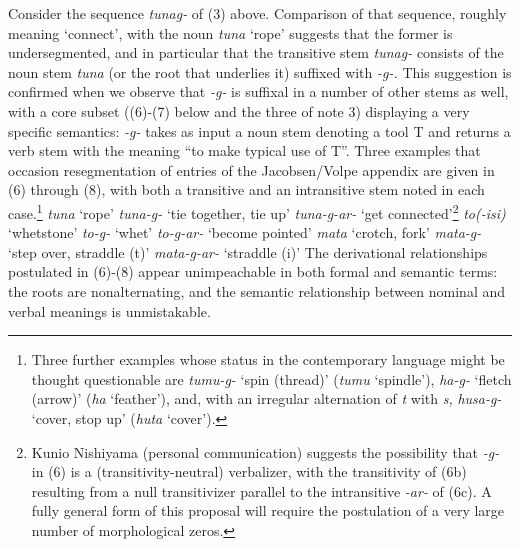 \documentclass[output=paper,
modfonts
]{LSP/langsci}
\begin{document}
Consider the sequence \textit{tunag-} of (3) above. Comparison of that
sequence, roughly meaning `connect', with the noun \textit{tuna} `rope'
suggests that the former is undersegmented, and in particular that the
transitive stem \textit{tunag-} consists of the noun stem \textit{tuna} (or
the root that underlies it) suffixed with \textit{-g-.} This suggestion is
confirmed when we observe that \textit{-g-} is suffixal in a number of
other stems as well, with a core subset ((6)-(7) below and the three of
note 3) displaying a very specific semantics: \textit{-g-} takes as input
a noun stem denoting a tool T and returns a verb stem with the meaning
``to make typical use of T''. Three examples that occasion
resegmentation of entries of the Jacobsen/Volpe appendix are given in
(6) through (8), with both a transitive and an intransitive stem noted
in each case.\footnote{Three further examples whose status in the
  contemporary language might be thought questionable are \textit{tumu-g-}
  `spin (thread)' (\textit{tumu} `spindle'), \textit{ha-g-} `fletch (arrow)'
  (\textit{ha} `feather'), and, with an irregular alternation of \textit{t}
  with \textit{s,} \textit{husa-g-} `cover, stop up' (\textit{huta} `cover').}
\ea
	 \ea \textit{tuna} `rope'
	 \ex \textit{tuna-g-} `tie together, tie up'
	 \ex \textit{tuna-g-ar-} `get connected'\footnote{Kunio Nishiyama (personal
  	communication) suggests the possibility that \textit{-g-} in (6) is a
  	(transitivity-neutral) verbalizer, with the transitivity of (6b)
  	resulting from a null transitivizer parallel to the intransitive
  	\textit{-ar-} of (6c). A fully general form of this proposal will
  	require the postulation of a very large number of morphological zeros.}
	\z
\ex 
	 \ea \textit{to(-isi)} `whetstone'
	 \ex \textit{to-g-} `whet'
	 \ex \textit{to-g-ar-} `become pointed'
	\z
\ex 
	 \ea \textit{mata} `crotch, fork'
	 \ex \textit{mata-g-} `step over, straddle (t)'
	 \ex \textit{mata-g-ar-} `straddle (i)'
	\z
\z
The derivational relationships postulated in (6)-(8) appear
unimpeachable in both formal and semantic terms: the roots are
nonalternating, and the semantic relationship between nominal and verbal
meanings is unmistakable.
\end{document}
